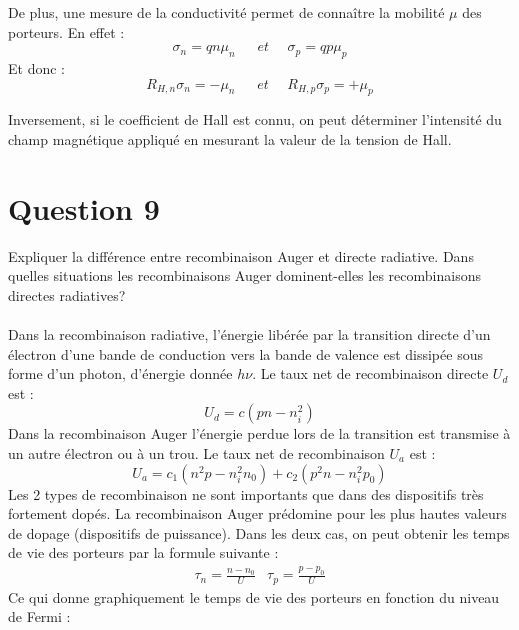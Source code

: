 De plus, une mesure de la conductivité permet de connaître la mobilité $\mu$ des porteurs. En effet :
\begin{equation}
\sigma _n =qn\mu _n ~~~~~~~et ~~~~~~ \sigma _p=qp\mu _p
\end{equation}
Et donc :
\begin{equation}
R_{H,n}\sigma _n=-\mu _n ~~~~~~~et ~~~~~~ R_{H,p}\sigma _p=+\mu _p 
\end{equation}

Inversement, si le coefficient de Hall est connu, on peut déterminer l'intensité du champ magnétique appliqué en mesurant la valeur de la tension de Hall.
\section{Question 9}
Expliquer la différence entre recombinaison Auger et directe radiative. Dans quelles situations les recombinaisons Auger dominent-elles les recombinaisons directes radiatives?
\\
\hbox{}
\\
Dans la recombinaison radiative, l'énergie libérée par la transition directe d'un électron d'une bande de conduction vers la bande de valence est dissipée sous forme d'un photon, d'énergie donnée $h\nu $. Le taux net de recombinaison directe $U_d$ est :
\begin{equation}
U_d=c(pn-n_i^2)
\end{equation}
Dans la recombinaison Auger l'énergie perdue lors de la transition est transmise à un autre électron ou à un trou. Le taux net de recombinaison $U_a$ est :
\begin{equation}
U_a=c_1(n^2p-n_i^2n_0)+c_2(p^2n-n_i^2p_0)
\end{equation}
Les 2 types de recombinaison ne sont importants que dans des dispositifs très fortement dopés. La recombinaison Auger prédomine pour les plus hautes valeurs de dopage (dispositifs de puissance). Dans les deux cas, on peut obtenir les temps de vie des porteurs par la formule suivante :
\begin{equation}
\begin{array}{cc}
\tau_n=\frac{n-n_0}{U} & \tau_p=\frac{p-p_0}{U} 
\end{array} 
\end{equation}
Ce qui donne graphiquement le temps de vie des porteurs en fonction du niveau de Fermi :\\
